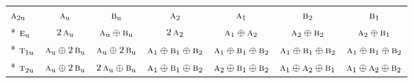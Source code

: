 \documentclass[10pt,a4paper]{article}
\numberwithin{equation}{section}
\newcommand{\irr}[1]{\text{\normalfont\scshape #1}}
\newcommand{\ptag}[1]{\mathrm{#1}}
\begin{document}
{\begin{longtable}{@{}lcccccc@{}}
$\irr{a}_{2\ptag{u}}$ & $\irr{a}_{\ptag{u}}$ & $\irr{b}_{\ptag{u}}$ & $\irr{a}_{2}$ & $\irr{a}_{1}$ & $\irr{b}_{2}$ & $\irr{b}_{1}$\\*
$\irr{e}_{\ptag{u}}$ & $2\,\irr{a}_{\ptag{u}}$ & $\irr{a}_{\ptag{u}}\oplus \irr{b}_{\ptag{u}}$ & $2\,\irr{a}_{2}$ & $\irr{a}_{1}\oplus \irr{a}_{2}$ & $\irr{a}_{2}\oplus \irr{b}_{2}$ & $\irr{a}_{2}\oplus \irr{b}_{1}$\\*
$\irr{t}_{1\ptag{u}}$ & $\irr{a}_{\ptag{u}}\oplus 2\,\irr{b}_{\ptag{u}}$ & $\irr{a}_{\ptag{u}}\oplus 2\,\irr{b}_{\ptag{u}}$ & $\irr{a}_{1}\oplus \irr{b}_{1}\oplus \irr{b}_{2}$ & $\irr{a}_{1}\oplus \irr{b}_{1}\oplus \irr{b}_{2}$ & $\irr{a}_{1}\oplus \irr{b}_{1}\oplus \irr{b}_{2}$ & $\irr{a}_{1}\oplus \irr{b}_{1}\oplus \irr{b}_{2}$\\*
$\irr{t}_{2\ptag{u}}$ & $\irr{a}_{\ptag{u}}\oplus 2\,\irr{b}_{\ptag{u}}$ & $2\,\irr{a}_{\ptag{u}}\oplus \irr{b}_{\ptag{u}}$ & $\irr{a}_{1}\oplus \irr{b}_{1}\oplus \irr{b}_{2}$ & $\irr{a}_{2}\oplus \irr{b}_{1}\oplus \irr{b}_{2}$ & $\irr{a}_{1}\oplus \irr{a}_{2}\oplus \irr{b}_{1}$ & $\irr{a}_{1}\oplus \irr{a}_{2}\oplus \irr{b}_{2}$\\
\bottomrule\end{longtable}}
\end{document}
